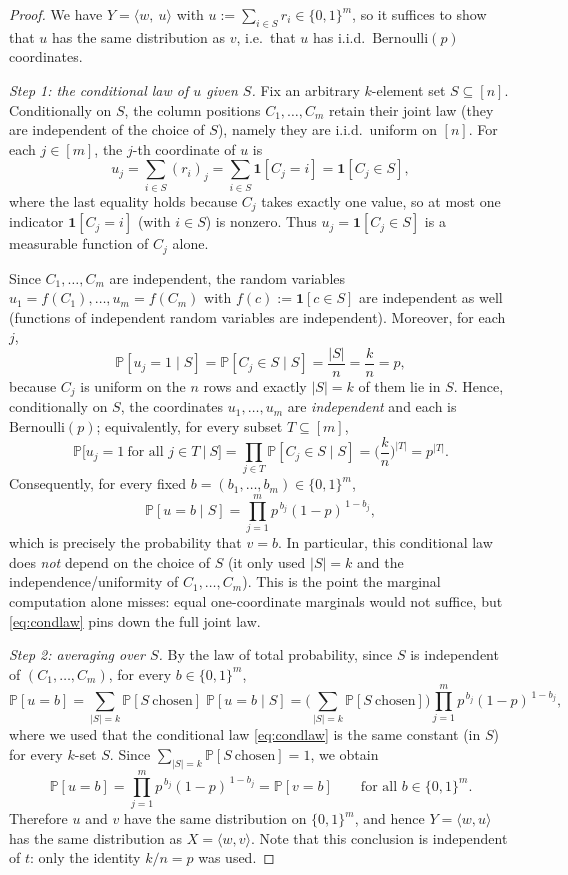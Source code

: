 \documentclass[11pt]{amsart}
\theoremstyle{plain}
\theoremstyle{definition}
\def\Pb{\mathbb{P}}
\begin{document}
\begin{proof}
We have $Y=\big\langle w,\ u\big\rangle$ with $u:=\sum_{i\in S}r_i\in\{0,1\}^m$, so
it suffices to show that $u$ has the same distribution as $v$, i.e.\ that $u$ has
i.i.d.\ $\mathrm{Bernoulli}(p)$ coordinates.

\medskip
\emph{Step 1: the conditional law of $u$ given $S$.}
Fix an arbitrary $k$-element set $S\subseteq[n]$. Conditionally on $S$, the column
positions $C_1,\dots,C_m$ retain their joint law (they are independent of the
choice of $S$), namely they are i.i.d.\ uniform on $[n]$. For each $j\in[m]$, the
$j$-th coordinate of $u$ is
\[
u_j=\sum_{i\in S}(r_i)_j=\sum_{i\in S}\mathbf 1[C_j=i]=\mathbf 1[C_j\in S],
\]
where the last equality holds because $C_j$ takes exactly one value, so at most one
indicator $\mathbf 1[C_j=i]$ (with $i\in S$) is nonzero. Thus
$u_j=\mathbf 1[C_j\in S]$ is a measurable function of $C_j$ alone.

Since $C_1,\dots,C_m$ are independent, the random variables
$u_1=f(C_1),\dots,u_m=f(C_m)$ with $f(c):=\mathbf 1[c\in S]$ are independent as
well (functions of independent random variables are independent). Moreover, for
each $j$,
\[
\Pb[u_j=1\mid S]=\Pb[C_j\in S\mid S]=\frac{|S|}{n}=\frac{k}{n}=p,
\]
because $C_j$ is uniform on the $n$ rows and exactly $|S|=k$ of them lie in $S$.
Hence, conditionally on $S$, the coordinates $u_1,\dots,u_m$ are
\emph{independent} and each is $\mathrm{Bernoulli}(p)$; equivalently, for every
subset $T\subseteq[m]$,
\[
\Pb\big[u_j=1\ \text{for all } j\in T\ \big|\ S\big]
=\prod_{j\in T}\Pb[C_j\in S\mid S]=\Big(\frac{k}{n}\Big)^{|T|}=p^{|T|}.
\]
Consequently, for every fixed $b=(b_1,\dots,b_m)\in\{0,1\}^m$,
\begin{equation}\label{eq:condlaw}
\Pb[u=b\mid S]=\prod_{j=1}^m p^{\,b_j}(1-p)^{\,1-b_j},
\end{equation}
which is precisely the probability that $v=b$. In particular, this conditional law
does \emph{not} depend on the choice of $S$ (it only used $|S|=k$ and the
independence/uniformity of $C_1,\dots,C_m$). This is the point the marginal
computation alone misses: equal one-coordinate marginals would not suffice, but
\eqref{eq:condlaw} pins down the full joint law.

\medskip
\emph{Step 2: averaging over $S$.}
By the law of total probability, since $S$ is independent of
$(C_1,\dots,C_m)$, for every $b\in\{0,1\}^m$,
\[
\Pb[u=b]=\sum_{|S|=k}\Pb[S\ \text{chosen}]\;\Pb[u=b\mid S]
=\Big(\sum_{|S|=k}\Pb[S\ \text{chosen}]\Big)\prod_{j=1}^m p^{\,b_j}(1-p)^{\,1-b_j},
\]
where we used that the conditional law \eqref{eq:condlaw} is the same constant
(in $S$) for every $k$-set $S$. Since $\sum_{|S|=k}\Pb[S\ \text{chosen}]=1$, we
obtain
\[
\Pb[u=b]=\prod_{j=1}^m p^{\,b_j}(1-p)^{\,1-b_j}=\Pb[v=b]
\qquad\text{for all } b\in\{0,1\}^m.
\]
Therefore $u$ and $v$ have the same distribution on $\{0,1\}^m$, and hence
$Y=\langle w,u\rangle$ has the same distribution as $X=\langle w,v\rangle$. Note
that this conclusion is independent of $t$: only the identity $k/n=p$ was used.
\end{proof}
\end{document}
